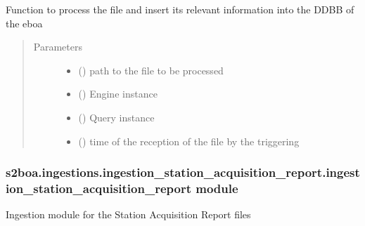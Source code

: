 \begin{fulllineitems}
\label{\detokenize{s2boa.ingestions:s2boa.ingestions.ingestion_slot_request_edrs.ingestion_slot_request_edrs.process_file}}
Function to process the file and insert its relevant information
into the DDBB of the eboa
\begin{quote}\begin{description}
\item[{Parameters}] \leavevmode\begin{itemize}
\item {} 
 () \textendash{} path to the file to be processed

\item {} 
 () \textendash{} Engine instance

\item {} 
 () \textendash{} Query instance

\item {} 
 () \textendash{} time of the reception of the file by the triggering

\end{itemize}

\end{description}\end{quote}

\end{fulllineitems}



\subsubsection{s2boa.ingestions.ingestion\_station\_acquisition\_report.ingestion\_station\_acquisition\_report module}
\label{\detokenize{s2boa.ingestions:module-s2boa.ingestions.ingestion_station_acquisition_report.ingestion_station_acquisition_report}}\label{\detokenize{s2boa.ingestions:s2boa-ingestions-ingestion-station-acquisition-report-ingestion-station-acquisition-report-module}}
Ingestion module for the Station Acquisition Report files

